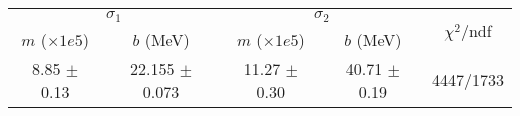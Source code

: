 \begin{tabular}{cc|cc||c}
\multicolumn{2}{c|}{$\sigma_1$} & \multicolumn{2}{|c}{$\sigma_2$} & \multirow{2}{*}{$\chi^2/$ndf} \\
$m$ ($\times1e5$) & $b$ (MeV) & $m$ ($\times1e5$) & $b$ (MeV) & \\
\hline
8.85 $\pm$ 0.13 & 22.155 $\pm$ 0.073 & 11.27 $\pm$ 0.30 & 40.71 $\pm$ 0.19 & 4447/1733\\
\end{tabular}
